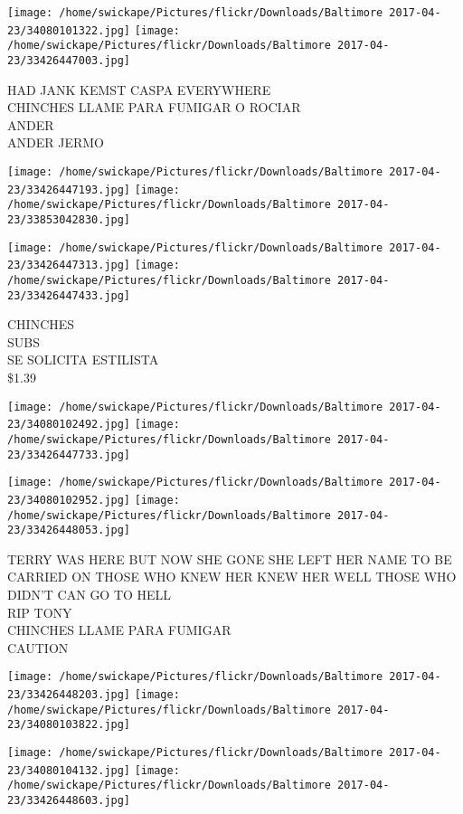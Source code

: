 \documentclass[10pt,letterpaper]{article}
\begin{document}
\texttt{[image: /home/swickape/Pictures/flickr/Downloads/Baltimore 2017-04-23/34080101322.jpg]}
\texttt{[image: /home/swickape/Pictures/flickr/Downloads/Baltimore 2017-04-23/33426447003.jpg]}

HAD JANK KEMST CASPA EVERYWHERE\\
CHINCHES LLAME PARA FUMIGAR O ROCIAR\\
ANDER\\
ANDER JERMO\\
\pagebreak

\texttt{[image: /home/swickape/Pictures/flickr/Downloads/Baltimore 2017-04-23/33426447193.jpg]}
\texttt{[image: /home/swickape/Pictures/flickr/Downloads/Baltimore 2017-04-23/33853042830.jpg]}

\texttt{[image: /home/swickape/Pictures/flickr/Downloads/Baltimore 2017-04-23/33426447313.jpg]}
\texttt{[image: /home/swickape/Pictures/flickr/Downloads/Baltimore 2017-04-23/33426447433.jpg]}

CHINCHES\\
SUBS\\
SE SOLICITA ESTILISTA\\
\$1.39\\
\pagebreak

\texttt{[image: /home/swickape/Pictures/flickr/Downloads/Baltimore 2017-04-23/34080102492.jpg]}
\texttt{[image: /home/swickape/Pictures/flickr/Downloads/Baltimore 2017-04-23/33426447733.jpg]}

\texttt{[image: /home/swickape/Pictures/flickr/Downloads/Baltimore 2017-04-23/34080102952.jpg]}
\texttt{[image: /home/swickape/Pictures/flickr/Downloads/Baltimore 2017-04-23/33426448053.jpg]}

TERRY WAS HERE BUT NOW SHE GONE SHE LEFT HER NAME TO BE CARRIED ON THOSE WHO KNEW HER KNEW HER WELL THOSE WHO DIDN'T CAN GO TO HELL\\
RIP TONY\\
CHINCHES LLAME PARA FUMIGAR\\
CAUTION\\
\pagebreak

\texttt{[image: /home/swickape/Pictures/flickr/Downloads/Baltimore 2017-04-23/33426448203.jpg]}
\texttt{[image: /home/swickape/Pictures/flickr/Downloads/Baltimore 2017-04-23/34080103822.jpg]}

\texttt{[image: /home/swickape/Pictures/flickr/Downloads/Baltimore 2017-04-23/34080104132.jpg]}
\texttt{[image: /home/swickape/Pictures/flickr/Downloads/Baltimore 2017-04-23/33426448603.jpg]}
\end{document}
